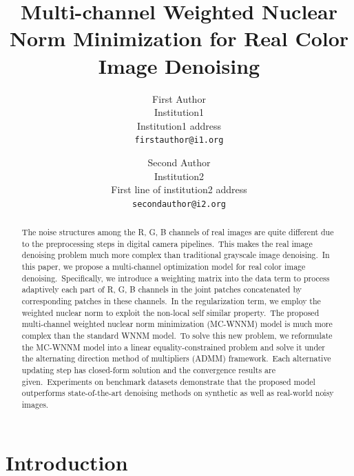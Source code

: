 \documentclass[10pt,twocolumn,letterpaper,sort&compress]{article}
\begin{document}
\title{Multi-channel Weighted Nuclear Norm Minimization for Real Color Image Denoising}

\author{First Author\\
Institution1\\
Institution1 address\\
{\tt\small firstauthor@i1.org}
\and
Second Author\\
Institution2\\
First line of institution2 address\\
{\tt\small secondauthor@i2.org}
}

\maketitle

\begin{abstract}
The noise structures among the R, G, B channels of real images are quite different due to the preprocessing steps in digital camera pipelines.\ This makes the real image denoising problem much more complex than traditional grayscale image denoising.\ In this paper, we propose a multi-channel optimization model for real color image denoising.\ Specifically, we introduce a weighting matrix into the data term to process adaptively each part of R, G, B channels in the joint patches concatenated by corresponding patches in these channels.\ In the regularization term, we employ the weighted nuclear norm to exploit the non-local self similar property.\ The proposed multi-channel weighted nuclear norm minimization (MC-WNNM) model is much more complex than the standard WNNM model.\ To solve this new problem, we reformulate the MC-WNNM model into a linear equality-constrained problem and solve it under the alternating direction method of multipliers (ADMM) framework.\ Each alternative updating step has closed-form solution and the convergence results are given.\ Experiments on benchmark datasets demonstrate that the proposed model outperforms state-of-the-art denoising methods on synthetic as well as real-world noisy images.
\end{abstract}

\section{Introduction}
\end{document}
